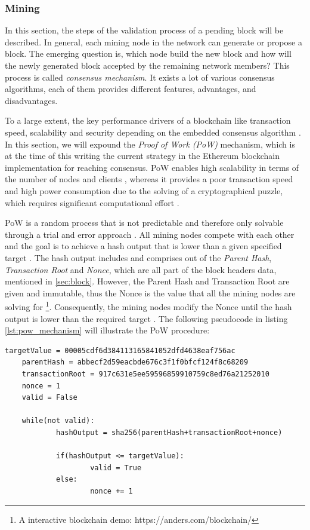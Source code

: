 \subsubsection{Mining}
\label{sec:mining}
In this section, the steps of the validation process of a pending block will be described. 
In general, each mining node in the network can generate or propose a block. 
The emerging question is, which node build the new block and how will the newly 
generated block accepted by the remaining network members? 
This process is called \textit{consensus mechanism}.
It exists a lot of various consensus algorithms, each of them provides different features,
advantages, and disadvantages. 

To a large extent, the key performance drivers of a blockchain
like transaction speed, scalability and security depending on the embedded consensus algorithm . 
In this section, we will expound the \textit{Proof of Work (PoW)} mechanism, 
which is at the time of this writing the current strategy in the Ethereum blockchain 
implementation for reaching consensus. 
PoW enables high scalability in terms of the number 
of nodes and clients , whereas it provides a poor transaction speed and high 
power consumption due to the solving of a cryptographical puzzle, which requires 
significant computational effort . 

PoW is a random process that is not predictable and therefore only solvable through a 
trial and error approach . 
All mining nodes compete with each other and the goal is to achieve a hash output that 
is lower than a given specified target .
The hash output includes and comprises out of the \textit{Parent Hash}, \textit{Transaction Root} and
\textit{Nonce}, which are all part of the block headers data, mentioned in \ref{sec:block}.
However, the Parent Hash and Transaction Root are given and immutable, thus the Nonce
is the value that all the mining nodes are solving for \footnote{A interactive blockchain demo: https://anders.com/blockchain/}.
Consequently, the mining nodes modify the Nonce until the hash output is lower than the required target .
The following pseudocode in listing \ref{lst:pow_mechanism} will illustrate the PoW procedure:

\vspace{7mm}
\begin{lstlisting}[label={lst:pow_mechanism}, caption={Pseudocode for PoW mechanism}]
	targetValue = 00005cdf6d384113165841052dfd4638eaf756ac
	parentHash = abbecf2d59eacbde676c3f1f0bfcf124f8c68209
	transactionRoot = 917c631e5ee59596859910759c8ed76a21252010
	nonce = 1
	valid = False

	while(not valid):
			hashOutput = sha256(parentHash+transactionRoot+nonce)
		
			if(hashOutput <= targetValue):
					valid = True
			else:
					nonce += 1

\end{lstlisting}
\clearpage

